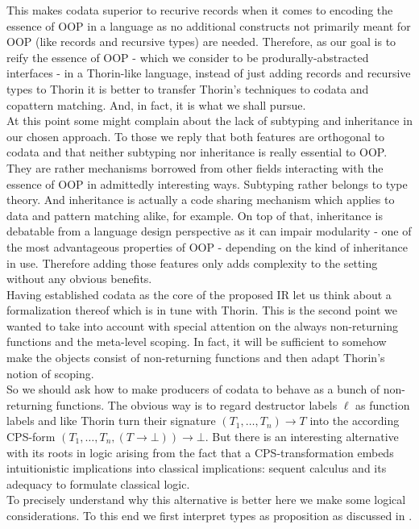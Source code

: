 This makes codata superior to recurive records when it comes to encoding the essence of OOP in a language as no additional constructs not primarily meant for OOP (like records and recursive types) are needed.
Therefore, as our goal is to reify the essence of OOP - which we consider to be produrally-abstracted interfaces - in a Thorin-like language, instead of just adding records and recursive types to Thorin it is better to transfer Thorin's techniques to codata and copattern matching.
And, in fact, it is what we shall pursue.
\\
At this point some might complain about the lack of subtyping and inheritance in our chosen approach.
To those we reply that both features are orthogonal to codata and that neither subtyping nor inheritance is really essential to OOP.
They are rather mechanisms borrowed from other fields interacting with the essence of OOP in admittedly interesting ways.
Subtyping rather belongs to type theory.
And inheritance is actually a code sharing mechanism which applies to data and pattern matching alike, for example.
On top of that, inheritance is debatable from a language design perspective as it can impair modularity - one of the most advantageous properties of OOP - depending on the kind of inheritance in use.
Therefore adding those features only adds complexity to the setting without any obvious benefits.
\\
Having established codata as the core of the proposed IR let us think about a formalization thereof which is in tune with Thorin.
This is the second point we wanted to take into account with special attention on the always non-returning functions and the meta-level scoping.
In fact, it will be sufficient to somehow make the objects consist of non-returning functions and then adapt Thorin's notion of scoping.
\\
So we should ask how to make producers of codata to behave as a bunch of non-returning functions.
The obvious way is to regard destructor labels $\ell$ as function labels and like Thorin turn their signature $(T_{1}, \ldots, T_{n}) \to T$ into the according CPS-form $(T_{1}, \ldots, T_{n}, (T \to \bot)) \to \bot$.
But there is an interesting alternative with its roots in logic arising from the fact that a CPS-transformation embeds intuitionistic implications into classical implications: sequent calculus and its adequacy to formulate classical logic.
\\
To precisely understand why this alternative is better here we make some logical considerations.
To this end we first interpret types as proposition as discussed in \cite{10.1145/2699407}.
